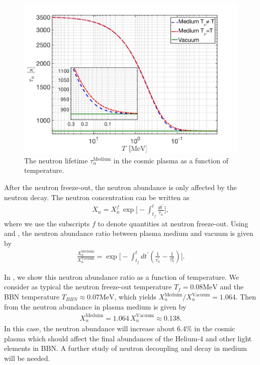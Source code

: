 \begin{figure} 
\centerline{\includegraphics[width=0.8\linewidth]{./plots/Neutron_Lifetime_001}}
\caption{The neutron lifetime $\tau_n^\mathrm{Medium}$ in the cosmic plasma as a function of temperature.}
\label{Decay_Rate} 
\end{figure}

After the neutron freeze-out, the neutron abundance is only affected by the neutron decay. The neutron concentration can be written as 
\begin{align}
\label{Abundance}
X_n=X_n^f\,\exp\bigg[-\int^t_{t_f}\frac{dt^\prime}{\tau_n}\bigg],
\end{align}
where we use the subscripts $f$ to denote quantities at neutron freeze-out. Using  and , the neutron abundance ratio between plasma medium and vacuum is given by
\begin{align}
\label{Abundance_Ratio}
\frac{X_n^{\mathrm{Meduim}}}{X_n^{\mathrm{Vacuum}}}=\exp\bigg[-\int^t_{t_f}dt^\prime\left(\frac{1}{\tau^\prime_n}-\frac{1}{\tau^0_n}\right)\bigg].
\end{align}

In , we show this neutron abundance ratio as a function of temperature. We consider as typical the neutron freeze-out temperature $T_f=0.08\mathrm{MeV}$ and the BBN  temperature $T_{BBN}\approx0.07\mathrm{MeV}$, which yields ${X_n^{\mathrm{Meduim}}}/{X_n^{\mathrm{Vacuum}}}=1.064$. Then from  the neutron abundance in plasma medium is given by
\begin{align}
X_n^{\mathrm{Meduim}}=1.064\,X_n^{\mathrm{Vacuum}}\approx0.138.
\end{align}
In this case, the neutron abundance will increase about $6.4\%$ in the cosmic plasma which should affect the final abundances of the Helium-4 and other light elements in BBN. A further study of neutron decoupling and decay in medium will be needed. 
 
